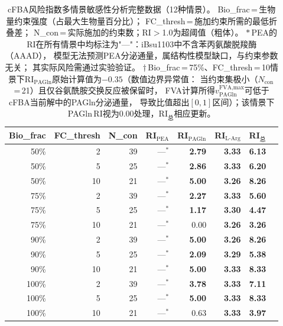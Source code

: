 \documentclass[10pt, a4paper, twocolumn]{ctexart}
\begin{document}
\begin{table}[h!]
\caption{cFBA风险指数多情景敏感性分析完整数据（12种情景）。
  Bio\_frac\,=\,生物量约束强度（占最大生物量百分比）；
  FC\_thresh\,=\,施加约束所需的最低折叠差；
  N\_con\,=\,实际施加的约束数；RI$>$1.0为超阈值（粗体）。
  $*$\,PEA的RI在所有情景中均标注为"—"：iBsu1103中不含苯丙氨酸脱羧酶（AAAD），
  模型无法预测PEA分泌通量，属结构性模型缺口，与约束参数无关；
  其实际风险需通过实验验证。
  $\dagger$\,Bio\_frac\,=\,75\%、FC\_thresh\,=\,10情景下RI$_{\text{PAGln}}$原始计算值为$-0.35$（数值边界异常值：
  当约束集极小（$N_{\text{con}}$\,=\,21）且仅谷氨酰胺交换反应被保留时，
  FVA计算所得$v^{\text{FVA,max}}_{\text{PAGln}}$可低于cFBA当前解中的PAGln分泌通量，
  导致比值超出$[0,1]$区间）；该情景下PAGln\,RI视为0.00处理，RI$_{\text{总}}$相应更新。}
\label{tab:sensitivity}
\small
\centering
\begin{tabular}{rrrrrrrr}
\toprule
\textbf{Bio\_frac} & \textbf{FC\_thresh} & \textbf{N\_con} &
\textbf{RI$_{\text{PEA}}$} & \textbf{RI$_{\text{PAGln}}$} &
\textbf{RI$_{\text{L-Arg}}$} & \textbf{RI$_{\text{总}}$} \\
\midrule
50\%  & 2  & 39 & —$^*$ & \textbf{2.79} & \textbf{3.33} & \textbf{6.13} \\
50\%  & 5  & 25 & —$^*$ & \textbf{2.86} & \textbf{3.33} & \textbf{6.20} \\
50\%  & 10 & 21 & —$^*$ & \textbf{5.00} & \textbf{3.26} & \textbf{8.26} \\
75\%  & 2  & 39 & —$^*$ & \textbf{2.27} & \textbf{3.33} & \textbf{5.60} \\
75\%  & 5  & 25 & —$^*$ & \textbf{1.17} & \textbf{3.30} & \textbf{4.47} \\
75\%  & 10 & 21 & —$^*$ & 0.00 & \textbf{3.26} & \textbf{3.26} \\
90\%  & 2  & 39 & —$^*$ & \textbf{5.00} & \textbf{3.26} & \textbf{8.26} \\
90\%  & 5  & 25 & —$^*$ & \textbf{2.09} & \textbf{3.29} & \textbf{5.38} \\
90\%  & 10 & 21 & —$^*$ & \textbf{5.00} & \textbf{3.33} & \textbf{8.33} \\
100\% & 2  & 39 & —$^*$ & \textbf{3.78} & \textbf{3.33} & \textbf{7.11} \\
100\% & 5  & 25 & —$^*$ & \textbf{5.00} & \textbf{3.33} & \textbf{8.33} \\
100\% & 10 & 21 & —$^*$ & 0.63 & \textbf{3.33} & \textbf{3.97} \\
\bottomrule
\end{tabular}
\end{table}
\end{document}
